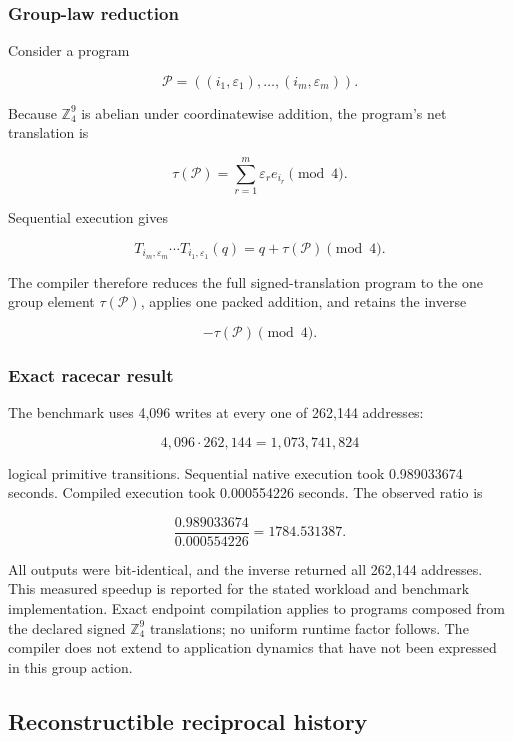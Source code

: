 \subsubsection{Group-law reduction}\label{viii-ch04-group-law-reduction}

Consider a program

\[
\mathcal P=((i_1,\varepsilon_1),\ldots,(i_m,\varepsilon_m)).
\]

Because \(\mathbb Z_4^9\) is abelian under coordinatewise addition, the
program's net translation is

\[
\tau(\mathcal P)
=\sum_{r=1}^m\varepsilon_re_{i_r}\pmod4.
\]

Sequential execution gives

\[
T_{i_m,\varepsilon_m}\cdots T_{i_1,\varepsilon_1}(q)
=q+\tau(\mathcal P)\pmod4.
\]

The compiler therefore reduces the full signed-translation program to
the one group element \(\tau(\mathcal P)\), applies one packed addition,
and retains the inverse

\[
-\tau(\mathcal P)\pmod4.
\]

\subsubsection{Exact racecar result}\label{viii-ch04-exact-racecar-result}

The benchmark uses 4,096 writes at every one of 262,144 addresses:

\[
4{,}096\cdot262{,}144
=1{,}073{,}741{,}824
\]

logical primitive transitions. Sequential native execution took
0.989033674 seconds. Compiled execution took 0.000554226 seconds. The
observed ratio is

\[
\frac{0.989033674}{0.000554226}
=1784.531387.
\]

All outputs were bit-identical, and the inverse returned all 262,144
addresses. This measured speedup is reported for the stated workload and
benchmark implementation. Exact endpoint compilation applies to programs
composed from the declared signed \(\mathbb Z_4^9\) translations; no
uniform runtime factor follows. The compiler does not extend to
application dynamics that have not been expressed in this group action.

\subsection{Reconstructible reciprocal
history}\label{viii-ch04-reconstructible-reciprocal-history}

